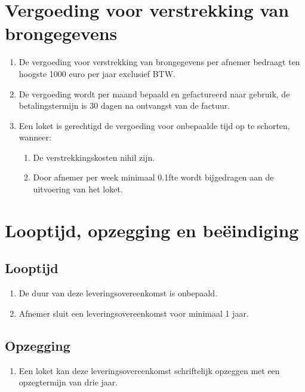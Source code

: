 \documentclass[10pt, a4paper]{article}
\begin{document}
\section{Vergoeding voor verstrekking van brongegevens}
\begin{enumerate}
   \item De vergoeding voor verstrekking van brongegevens per afnemer bedraagt ten hoogste 1000 euro per jaar exclusief BTW.
   \item De vergoeding wordt per maand bepaald en gefactureerd naar gebruik, de betalingstermijn is 30 dagen na ontvangst van de factuur.
   \item Een loket is gerechtigd de vergoeding voor onbepaalde tijd op te schorten, wanneer:
   \begin{enumerate}
        \item De verstrekkingskosten nihil zijn. 
        \item Door afnemer per week minimaal 0.1fte wordt bijgedragen aan de uitvoering van het loket.
   \end{enumerate}
\end{enumerate}

\section{Looptijd, opzegging en beëindiging}
\subsection*{Looptijd}
\begin{enumerate}
   \item De duur van deze leveringsovereenkomst is onbepaald.
   \item Afnemer sluit een leveringsovereenkomst voor minimaal 1 jaar.
\end{enumerate}

\subsection*{Opzegging}
\begin{enumerate}
   \item Een loket kan deze leveringsovereenkomst schriftelijk opzeggen met een opzegtermijn van drie jaar.
\end{enumerate}
\end{document}
